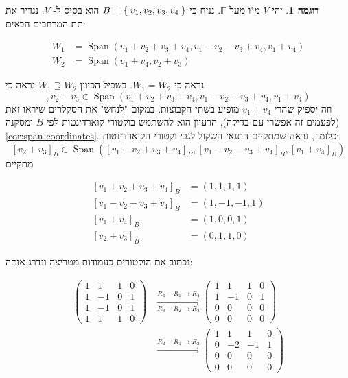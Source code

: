 \documentclass[12pt]{report}
\theoremstyle{plain}
\theoremstyle{definition}
\newtheorem{example}{דוגמה}[chapter]
\newcommand{\F}{\mathbb{F}}
\newcommand{\0}{\mathbf{0}}
\DeclareMathOperator{\Span}{Span}
\begin{document}
\begin{example}
יהי 
$V$
מ"ו מעל
$\F$.
נניח כי
$B=\Set{v_1,v_2,v_3,v_4}$
הוא בסיס ל-
$V$.
נגדיר את תת-המרחבים הבאים:

$$
\begin{aligned}
W_1&=\Span(v_1+v_2+v_3+v_4,v_1-v_2-v_3+v_4,v_1+v_4) \\
W_2&=\Span(v_1+v_4,v_2+v_3)
\end{aligned}
$$

נראה כי 
$W_1=W_2$.
בשביל הכיוון
$W_1\supseteq W_2$
נראה כי
$$,v_2+v_3\in\Span(v_1+v_2+v_3+v_4,v_1-v_2-v_3+v_4,v_1+v_4)$$
וזה יספיק שהרי 
$v_1+v_4$
מופיע בשתי הקבוצות. במקום "לנחש" את הסקלרים שיראו זאת (לפעמים זה אפשרי עם בדיקה), הרעיון הוא להשתמש בוקטורי קוארדינטות לפי 
$B$
ומסקנה
\ref{cor:span-coordinates}.
כלומר, נראה שמתקיים התנאי השקול לגבי וקטורי הקוארדינטות:
$$
[v_2+v_3]_B\in\Span([v_1+v_2+v_3+v_4]_B,[v_1-v_2-v_3+v_4]_B,[v_1+v_4]_B)
$$
מתקיים

$$
\begin{aligned}
[v_1+v_2+v_3+v_4]_B&=(1,1,1,1) \\
[v_1-v_2-v_3+v_4]_B&=(1,-1,-1,1) \\
[v_1+v_4]_B&=(1,0,0,1) \\
[v_2+v_3]_B&=(0,1,1,0)
\end{aligned}
$$

נכתוב את הוקטורים כעמודות מטריצה ונדרג אותה:

$$
\begin{aligned}
\left(\begin{array}{ccc|c}
1 & 1 & 1 & 0 \\
1 & -1 & 0 & 1 \\
1 & -1 & 0 & 1 \\
1 & 1 & 1 & 0
\end{array}\right)&\xrightarrow[R_3-R_2\to R_3]{R_4-R_1\to R_4}\left(\begin{array}{ccc|c}
1 & 1 & 1 & 0 \\
1 & -1 & 0 & 1 \\
0 & 0 & 0 & 0 \\
0 & 0 & 0 & 0
\end{array}\right) \\
&\xrightarrow{R_2-R_1\to R_2}\left(\begin{array}{ccc|c}
1 & 1 & 1 & 0 \\
0 & -2 & -1 & 1 \\
0 & 0 & 0 & 0 \\
0 & 0 & 0 & 0
\end{array}\right)
\end{aligned}
$$


\end{example}
\end{document}
